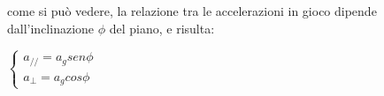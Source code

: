 come si può vedere, la relazione tra le accelerazioni in gioco dipende dall'inclinazione $\phi$ del piano, e risulta:

\begin{center}
\begin{math}
\left\{
\begin{array}{r}
a_{//} = a_g sen \phi \\
a_{\perp} = a_g cos \phi
\end{array}
\right.
\end{math}
\end{center}

